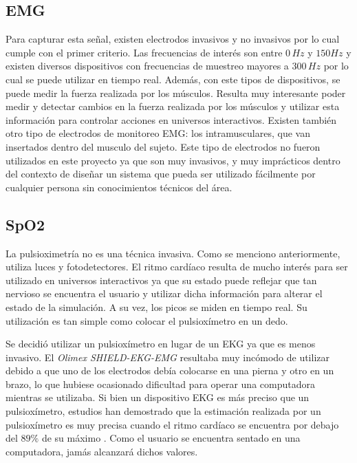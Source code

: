 \subsection{EMG}

Para capturar esta señal, existen electrodos invasivos y no invasivos por lo cual cumple con el primer criterio. Las frecuencias de interés son entre $0 \, Hz $ y $150 Hz$ y existen diversos dispositivos con frecuencias de muestreo mayores a $300 \, Hz$ por lo cual se puede utilizar en tiempo real. Además, con este tipos de dispositivos, se puede medir la fuerza realizada por los músculos. Resulta muy interesante poder medir y detectar cambios en la fuerza realizada por los músculos y utilizar esta información para controlar acciones en universos interactivos. Existen también otro tipo de electrodos de monitoreo EMG: los intramusculares, que van insertados dentro del musculo del sujeto. Este tipo de electrodos no fueron utilizados en este proyecto ya que son muy invasivos, y muy imprácticos dentro del contexto de diseñar un sistema que pueda ser utilizado fácilmente por cualquier persona sin conocimientos técnicos del área.

\subsection{SpO2}

La pulsioximetría no es una técnica invasiva. Como se menciono anteriormente, utiliza luces y fotodetectores. El ritmo cardíaco resulta de mucho interés para ser utilizado en universos interactivos ya que su estado puede reflejar que tan nervioso se encuentra el usuario y utilizar dicha información para alterar el estado de la simulación. A su vez, los picos se miden en tiempo real. Su utilización es tan simple como colocar el pulsioxímetro en un dedo.

Se decidió utilizar un pulsioxímetro en lugar de un EKG ya que es menos invasivo. El \emph{Olimex SHIELD-EKG-EMG} resultaba muy incómodo de utilizar debido a que uno de los electrodos debía colocarse en una pierna y otro en un brazo, lo que hubiese ocasionado dificultad para operar una computadora mientras se utilizaba. Si bien un dispositivo EKG es más preciso que un pulsioxímetro, estudios han demostrado que la estimación realizada por un pulsioxímetro es muy precisa cuando el ritmo cardíaco se encuentra por debajo del $89\% $ de su máximo \cite{spo2-accuracy}. Como el usuario se encuentra sentado en una computadora, jamás alcanzará dichos valores.

